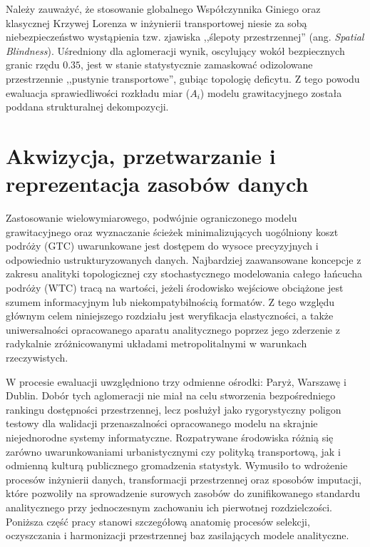 \documentclass{pracamgr}
\begin{document}
Należy zauważyć, że stosowanie globalnego Współczynnika Giniego oraz klasycznej Krzywej Lorenza w inżynierii transportowej niesie za sobą niebezpieczeństwo wystąpienia tzw. zjawiska ,,ślepoty przestrzennej'' (ang. \textit{Spatial Blindness}). Uśredniony dla aglomeracji wynik, oscylujący wokół bezpiecznych granic rzędu $0.35$, jest w stanie statystycznie zamaskować odizolowane przestrzennie ,,pustynie transportowe'', gubiąc topologię deficytu. Z tego powodu ewaluacja sprawiedliwości rozkładu miar ($A_i$) modelu grawitacyjnego została poddana strukturalnej dekompozycji.


\chapter{Akwizycja, przetwarzanie i reprezentacja zasobów danych}\label{chapter:dane}

Zastosowanie wielowymiarowego, podwójnie ograniczonego modelu grawitacyjnego oraz wyznaczanie ścieżek minimalizujących uogólniony koszt podróży (GTC) uwarunkowane jest dostępem do wysoce precyzyjnych i odpowiednio ustrukturyzowanych danych. Najbardziej zaawansowane koncepcje z zakresu analityki topologicznej czy stochastycznego modelowania całego łańcucha podróży (WTC) tracą na wartości, jeżeli środowisko wejściowe obciążone jest szumem informacyjnym lub niekompatybilnością formatów. Z tego względu głównym celem niniejszego rozdziału jest weryfikacja elastyczności, a także uniwersalności opracowanego aparatu analitycznego poprzez jego zderzenie z radykalnie zróżnicowanymi układami metropolitalnymi w warunkach rzeczywistych.

W procesie ewaluacji uwzględniono trzy odmienne ośrodki: Paryż, Warszawę i Dublin. Dobór tych aglomeracji nie miał na celu stworzenia bezpośredniego rankingu dostępności przestrzennej, lecz posłużył jako rygorystyczny poligon testowy dla walidacji przenaszalności opracowanego modelu na skrajnie niejednorodne systemy informatyczne. Rozpatrywane środowiska różnią się zarówno uwarunkowaniami urbanistycznymi czy polityką transportową, jak i odmienną kulturą publicznego gromadzenia statystyk. Wymusiło to wdrożenie procesów inżynierii danych, transformacji przestrzennej oraz sposobów imputacji, które pozwoliły na sprowadzenie surowych zasobów do zunifikowanego standardu analitycznego przy jednoczesnym zachowaniu ich pierwotnej rozdzielczości. Poniższa część pracy stanowi szczegółową anatomię procesów selekcji, oczyszczania i harmonizacji przestrzennej baz zasilających modele analityczne.
\end{document}
